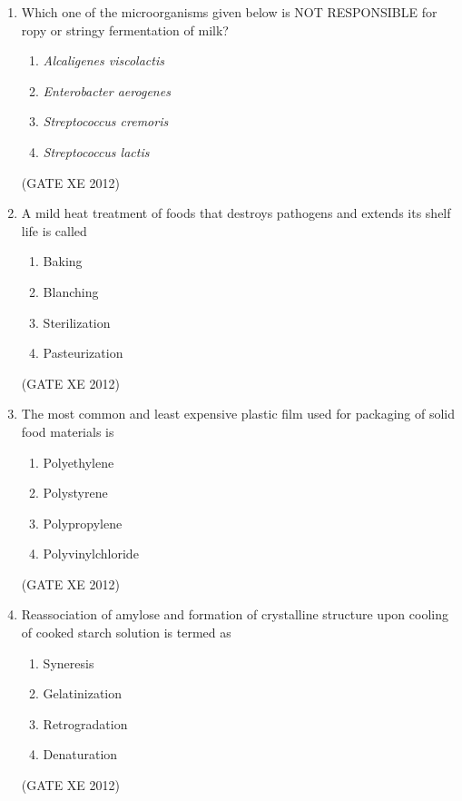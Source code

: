 \documentclass[12pt]{article}
\begin{document}
\begin{enumerate}
  \item Which one of the microorganisms given below is NOT RESPONSIBLE for ropy or stringy fermentation of milk?
  \begin{enumerate}
    \item \textit{Alcaligenes viscolactis}
    \item \textit{Enterobacter aerogenes}
    \item \textit{Streptococcus cremoris}
    \item \textit{Streptococcus lactis}
  \end{enumerate}
  (GATE XE 2012)

  \item A mild heat treatment of foods that destroys pathogens and extends its shelf life is called
  \begin{multicols}{2}
  \begin{enumerate}
    \item Baking
    \item Blanching
    \item Sterilization
    \item Pasteurization
  \end{enumerate}
  \end{multicols}
  (GATE XE 2012)

  \item The most common and least expensive plastic film used for packaging of solid food materials is
  \begin{multicols}{2}
  \begin{enumerate}
    \item Polyethylene
    \item Polystyrene
    \item Polypropylene
    \item Polyvinylchloride
  \end{enumerate}
  \end{multicols}
  (GATE XE 2012)

  \item Reassociation of amylose and formation of crystalline structure upon cooling of cooked starch solution is termed as
  \begin{multicols}{2}
  \begin{enumerate}
    \item Syneresis
    \item Gelatinization
    \item Retrogradation
    \item Denaturation
  \end{enumerate}
  \end{multicols}
  (GATE XE 2012)


\end{enumerate}
\end{document}
